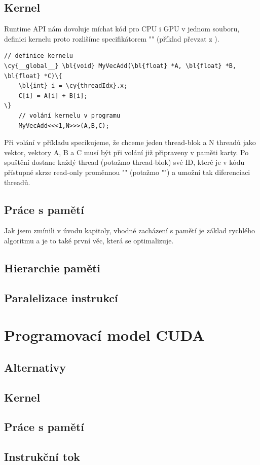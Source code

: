     \subsection{Kernel}
    
    Runtime API nám dovoluje míchat kód pro CPU i GPU v jednom souboru, definici kernelu proto rozlišíme specifikátorem 
    \Vr"" (příklad převzat z \cite{CUDA programming g.}).
    
    \begin{Verbatim}[commandchars = \\\{\}]
    // definice kernelu
\cy{__global__} \bl{void} MyVecAdd(\bl{float} *A, \bl{float} *B, \bl{float} *C)\{
    \bl{int} i = \cy{threadIdx}.x;
    C[i] = A[i] + B[i];
\}
    // volání kernelu v programu
    MyVecAdd<<<1,N>>>(A,B,C);
    \end{Verbatim}

    Při volání v příkladu specikujeme, že chceme jeden thread-blok a N threadů jako vektor, vektory A, B a C musí být při volání již připraveny v paměti karty. Po spuštění dostane každý thread (potažmo thread-blok) své ID, které je v kódu přístupné skrze read-only proměnnou \Vr"" (potažmo \Vr"") a umožní tak diferenciaci threadů.
    
    \subsection{Práce s pamětí}
    
    Jak jsem zmínili v úvodu kapitoly, vhodné zacházení s pamětí je základ rychlého algoritmu a je to také první věc, která se optimalizuje. 




    \subsection{Hierarchie paměti}
    \subsection{Paralelizace instrukcí}

\section{Programovací model CUDA}
    \subsection{Alternativy}
    \subsection{Kernel}
    \subsection{Práce s pamětí}
    \subsection{Instrukční tok}


